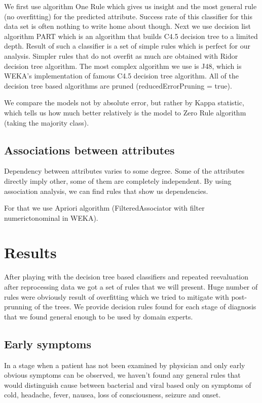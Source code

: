 \documentclass[11pt]{article}
\begin{document}
We first use algorithm One Rule which gives us insight and the most general
rule (no overfitting) for the predicted attribute. Success rate of this
classifier for this data set is often nothing to write home about though.  Next
we use decision list algorithm PART\cite{Frank1998} which is an algorithm that
builds C4.5 decision tree to a limited depth. Result of such a classifier is a
set of simple rules which is perfect for our analysis.  Simpler rules that do
not overfit as much are obtained with Ridor decision tree algorithm. The most
complex algorithm we use is J48, which is WEKA's implementation of famous C4.5
decision tree algorithm. All of the decision tree based algorithms are pruned
(reducedErrorPruning = true).

We compare the models not by absolute error, but rather by Kappa statistic,
which tells us how much better relatively is the model to Zero Rule algorithm
(taking the majority class).

\subsection{Associations between attributes}
Dependency between attributes varies to some degree. Some of the attributes
directly imply other, some of them are completely independent. By using
association analysis, we can find rules that show us dependencies.

For that we use Apriori algorithm (FilteredAssociator with filter
numerictonominal in WEKA).



\section{Results}
After playing with the decision tree based classifiers and repeated
reevaluation after reprocessing data we got a set of rules that we will
present. Huge number of rules were obviously result of overfitting which we
tried to mitigate with post-prunning of the trees. We provide decision rules
found for each stage of diagnosis that we found general enough to be used by
domain experts.

\subsection{Early symptoms}
In a stage when a patient has not been examined by physician and only early
obvious symptoms can be observed, we haven't found any general rules that would
distinguish cause between bacterial and viral based only on symptoms of cold,
headache, fever, nausea, loss of consciousness, seizure and onset.
\end{document}
